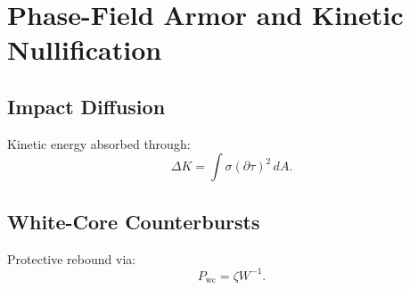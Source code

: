 \chapter{Phase-Field Armor and Kinetic Nullification}

\section{Impact Diffusion}
Kinetic energy absorbed through:
\[
\Delta K = \int \sigma(\partial\tau)^2\, dA.
\]

\section{White-Core Counterbursts}
Protective rebound via:
\[
P_{\mathrm{wc}} = \zeta W^{-1}.
\]

